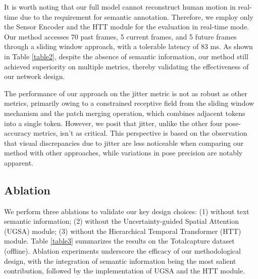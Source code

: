 \documentclass[letterpaper]{article} %
\begin{document}

It is worth noting that our full model cannot reconstruct human motion in real-time due to the requirement for semantic annotation. Therefore, we employ only the Sensor Encoder and the HTT module for the evaluation in real-time mode. Our method accesses 70 past frames, 5 current frames, and 5 future frames through a sliding window approach, with a tolerable latency of 83 ms. As shown in Table \ref{table2}, despite the absence of semantic information, our method still achieved superiority on multiple metrics, thereby validating the effectiveness of our network design.

The performance of our approach on the jitter metric is not as robust as other metrics, primarily owing to a constrained receptive field from the sliding window mechanism and the patch merging operation, which combines adjacent tokens into a single token. However, we posit that jitter,
unlike the other four pose-accuracy metrics, isn’t as critical. This perspective is based on the observation that visual discrepancies due to jitter are less noticeable when comparing our method with other approaches, while variations in pose precision are notably apparent.



\subsection{Ablation}
We perform three ablations to validate our key design choices: (1) without text semantic information; (2) without the Uncertainty-guided Spatial Attention (UGSA) module; (3) without the Hierarchical Temporal Transformer (HTT) module. Table \ref{table3} summarizes the results on the Totalcapture dataset (offline).
Ablation experiments underscore the efficacy of our methodological design, with the integration of semantic information being the most salient contribution, followed by the implementation of UGSA and the HTT module.
\end{document}
